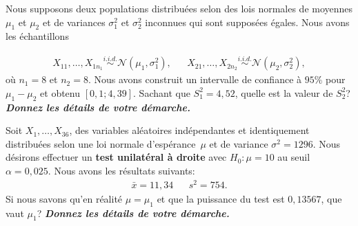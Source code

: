 \begin{questions}


\newpage


\question[10]
Nous supposons deux populations distribuées selon des lois normales de moyennes $\mu_1$ et $\mu_2$ et de variances $\sigma^2_1$ et $\sigma^2_2$ inconnues qui sont supposées égales. Nous avons les échantillons

\begin{align*}
X_{11}, \ldots, X_{1n_1} \overset{i.i.d.}{\sim} \mathcal{N}(\mu_1, \sigma^2_1), & & X_{21}, \ldots, X_{2n_2} \overset{i.i.d.}{\sim} \mathcal{N}(\mu_2, \sigma^2_2),
\end{align*}
où $n_1=8$ et $n_2=8$. Nous avons construit un intervalle de confiance à $95\%$ pour $\mu_1-\mu_2$ et obtenu $[0,1; 4,39]$. Sachant que $S^2_1=4,52$, quelle est la valeur de $S^2_2$? \textit{\textbf{Donnez les détails de votre démarche.}}



\newpage 
\question[10] Soit $X_1,\hdots, X_{36}$, des variables aléatoires indépendantes et identiquement distribuées selon une loi normale d'espérance~$\mu$ et de variance $\sigma^2=1296$.
Nous désirons effectuer un \textbf{test unilatéral à droite} avec $H_0:\mu=10$ au seuil $\alpha = 0,025$.
Nous avons les résultats suivants:
\begin{align*}
    \bar{x}= 11,34 &  & s^2=754.
\end{align*}
Si nous savons qu'en réalité $\mu=\mu_1$ et que la puissance du test est $0,13567$, que vaut $\mu_1$? \textbf{\textit{Donnez les détails de votre démarche.}}


\end{questions}
